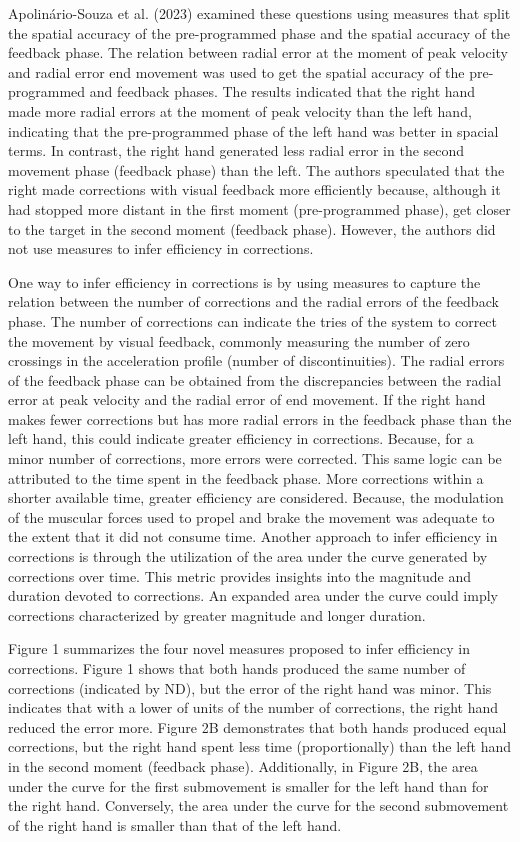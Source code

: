 \documentclass[man,a4paper,12pt,floatsintext]{apa6}
\begin{document}
Apolinário-Souza et al. (2023) examined these questions using measures that split the spatial accuracy of the pre-programmed phase and the spatial accuracy of the feedback phase. The relation between radial error at the moment of peak velocity and radial error end movement was used to get the spatial accuracy of the pre-programmed and feedback phases. The results indicated that the right hand made more radial errors at the moment of peak velocity than the left hand, indicating that the pre-programmed phase of the left hand was better in spacial terms. In contrast, the right hand generated less radial error in the second movement phase (feedback phase) than the left. The authors speculated that the right made corrections with visual feedback more efficiently because, although it had stopped more distant in the first moment (pre-programmed phase), get closer to the target in the second moment (feedback phase). However, the authors did not use measures to infer efficiency in corrections. 

One way to infer efficiency in corrections is by using measures to capture the relation between the number of corrections and the radial errors of the feedback phase. The number of corrections can indicate the tries of the system to correct the movement by visual feedback, commonly measuring the number of zero crossings in the acceleration profile (number of discontinuities)\citep{Elliott2010d}. The radial errors of the feedback phase can be obtained from the discrepancies between the radial error at peak velocity and the radial error of end movement. If the right hand makes fewer corrections but has more radial errors in the feedback phase than the left hand, this could indicate greater efficiency in corrections. Because, for a minor number of corrections, more errors were corrected. This same logic can be attributed to the time spent in the feedback phase. More corrections within a shorter available time, greater efficiency are considered. Because, the modulation of the muscular forces used to propel and brake the movement was adequate to the extent that it did not consume time. Another approach to infer efficiency in corrections is through the utilization of the area under the curve generated by corrections over time. This metric provides insights into the magnitude and duration devoted to corrections. An expanded area under the curve could imply corrections characterized by greater magnitude and longer duration.


Figure 1 summarizes the four novel measures proposed to infer efficiency in corrections. Figure 1 shows that both hands produced the same number of corrections (indicated by ND), but the error of the right hand was minor. This indicates that with a lower of units of the number of corrections, the right hand reduced the error more. Figure 2B demonstrates that both hands produced equal corrections, but the right hand spent less time (proportionally) than the left hand in the second moment (feedback phase). Additionally, in Figure 2B, the area under the curve for the first submovement is smaller for the left hand than for the right hand. Conversely, the area under the curve for the second submovement of the right hand is smaller than that of the left hand.
\end{document}
